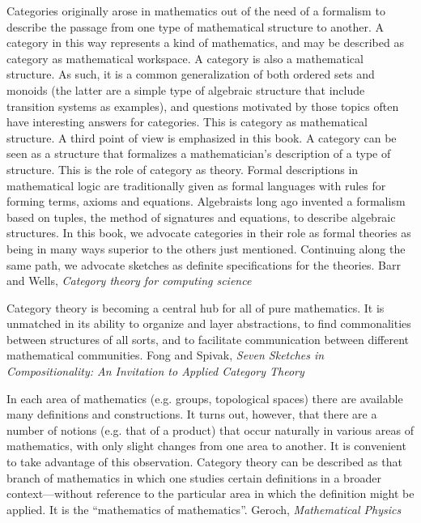 \documentclass[11pt,openany]{book}
\begin{document}
\begin{boxquote}
Categories originally arose in mathematics out of the need of a formalism to
describe the passage from one type of mathematical structure to another. A
category in this way represents a kind of mathematics, and may be described
as category as mathematical workspace.
A category is also a mathematical structure. As such, it is a common
generalization of both ordered sets and monoids (the latter are a simple
type of algebraic structure that include transition systems as examples),
and questions motivated by those topics often have interesting answers for
categories. This is category as mathematical structure.
A third point of view is emphasized in this book. A category can be seen
as a structure that formalizes a mathematician's description of a type of
structure. This is the role of category as theory. Formal descriptions in
mathematical logic are traditionally given as formal languages with rules for
forming terms, axioms and equations. Algebraists long ago invented a formalism
based on tuples, the method of signatures and equations, to describe
algebraic structures. In this book, we advocate categories in their role as formal
theories as being in many ways superior to the others just mentioned.
Continuing along the same path, we advocate sketches as definite specifications
for the theories.
\tcblower
{Barr and Wells, \emph{Category theory for computing science}~\cite{BarrWells:2020}}
\end{boxquote}

\begin{boxquote}
Category theory is becoming a central hub for all of pure mathematics. It is unmatched
in its ability to organize and layer abstractions, to find commonalities between structures
of all sorts, and to facilitate communication between different mathematical
communities.
\tcblower
{Fong and Spivak, \emph{Seven Sketches in Compositionality: 
An Invitation to Applied Category Theory}~\cite{FongSpivak:2018:SevenSketches}}
\end{boxquote}

\begin{boxquote}
In each area of mathematics 
(e.g. groups, topological spaces) 
there are available many definitions and constructions.
It turns out, however, that there are a number of notions
(e.g. that of a product) that occur naturally 
in various areas of mathematics, with only slight changes from
one area to another.
It is convenient to take advantage of this observation.
Category theory can be described as that branch of mathematics
in which one studies certain definitions in a broader context---without
reference to the particular area 
in which the definition might be applied.
It is the ``mathematics of mathematics''.
\tcblower
{Geroch, \emph{Mathematical Physics}~\cite{Geroch:1985:MathPhysics}}
\end{boxquote}
\end{document}

